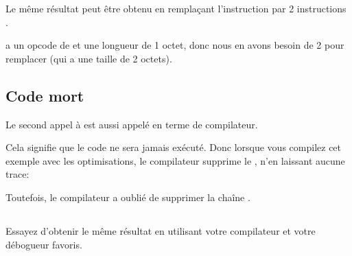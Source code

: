 

Le même résultat peut être obtenu en remplaçant l'instruction \JMP par 2 instructions
\NOP.

\NOP a un opcode de  et une longueur de 1 octet, donc nous en avons besoin
de 2 pour remplacer \JMP (qui a une taille de 2 octets).

\subsection{Code mort}

Le second appel à \printf est aussi appelé  en terme de compilateur.

Cela signifie que le code ne sera jamais exécuté.
Donc lorsque vous compilez cet exemple avec les optimisations, le compilateur supprime
le , n'en laissant aucune trace:



Toutefois, le compilateur a oublié de supprimer la chaîne .


\subsection{\Exercise}


Essayez d'obtenir le même résultat en utilisant votre compilateur et votre débogueur
favoris.
